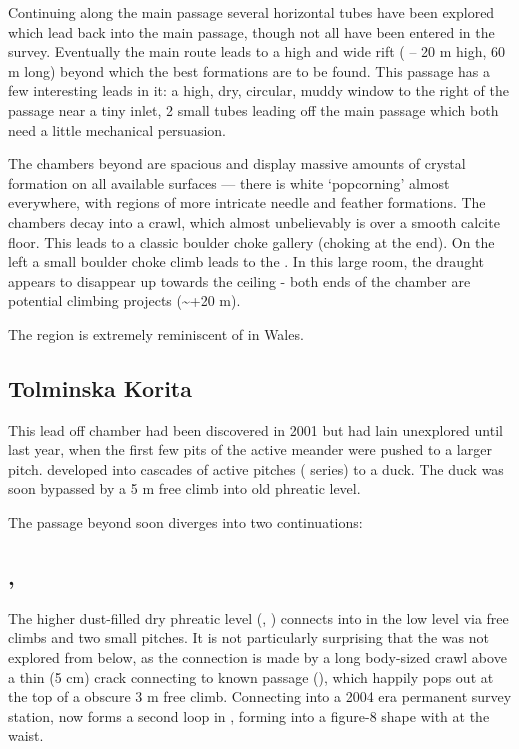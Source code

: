 Continuing along the main  passage several horizontal tubes have been explored which lead back into the main passage, though not all have
been entered in the survey. Eventually the main route leads to a high and wide rift ( -- 20 m high, 60 m long) beyond
which the best formations are to be found. This passage has a few interesting leads in it: a high, dry, circular, muddy window to the right of the passage near a tiny inlet, 2 small tubes leading off the main passage which both need a little mechanical persuasion.

The chambers beyond  are spacious and display massive amounts of crystal formation on all available surfaces --- there is
white `popcorning' almost everywhere, with regions of more intricate needle and feather formations. The chambers decay into a crawl, which almost unbelievably is over a smooth calcite floor. This leads to a classic boulder choke gallery (choking at the end). On the left a small boulder choke climb leads to the . In this large room, the draught appears to disappear up towards the ceiling - both ends of
the chamber are potential climbing projects (\textasciitilde +20 m).

The region is extremely reminiscent of  in Wales.


\subsection{Tolminska Korita}

This lead off  chamber had been discovered in 2001 but had lain unexplored until last year, when the first few pits of the active meander were pushed to a larger pitch.  developed into cascades of active pitches ( series) to a duck. The
duck was soon bypassed by a 5 m free climb into old phreatic level.

The passage beyond soon diverges into two continuations:


\subsection{, }

The higher dust-filled dry phreatic level (, ) connects into  in the low level via
free climbs and two small pitches. It is not particularly surprising that the  was not explored from below, as the
connection is made by a long body-sized crawl above a thin (5 cm) crack connecting to known passage (), which happily pops out at the
top of a obscure 3 m free climb. Connecting into a 2004 era permanent survey station,  now forms a second loop in ,
forming  into a figure-8 shape with  at the waist.

